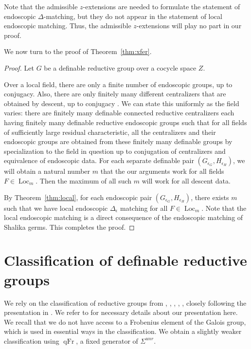 \documentclass[12pt]{amsart}
\newcommand{\op}[1]{\operatorname{#1}}
\theoremstyle{plain}
\theoremstyle{definition}
\begin{document}
Note that the admissible $z$-extensions are needed to formulate the
statement of endoscopic $\Delta$-matching, but they do not appear in
the statement of local endoscopic matching.  Thus, the admissible
$z$-extensions will play no part in our proof.

We now turn to the proof of Theorem~\ref{thm:xfer}.

\begin{proof} Let $G$ be a definable reductive group over a cocycle
  space $Z$.

  Over a local field, there are only a finite number of endoscopic
  groups, up to conjugacy.  Also, there are only finitely many
  different centralizers that are obtained by descent, up to conjugacy
  \cite[Sec.2.2]{LSd}.  We can state this uniformly as the field
  varies: there are finitely many definable connected reductive
  centralizers each having finitely many definable reductive
  endoscopic groups such that for all fields of sufficiently large
  residual characteristic, all the centralizers and their endoscopic
  groups are obtained from these finitely many definable groups by
  specialization to the field in question up to conjugation of
  centralizers and equivalence of endoscopic data.  For each separate
  definable pair $(G_{\epsilon_G},H_{\epsilon_H})$, we will obtain a
  natural number $m$ that the our arguments work for all fields $F\in
  \op{Loc}_m$.  Then the maximum of all such $m$ will work for all
  descent data.

  By Theorem~\ref{thm:local}, for each endoscopic pair
  $(G_{\epsilon_G},H_{\epsilon_H})$, there exists $m$ such that we
  have local endoscopic $\Delta_\epsilon$ matching for all
  $F\in\op{Loc}_m$.  Note that the local endoscopic matching is
  a direct consequence of the endoscopic matching of Shalika germs.  This
  completes the proof.
\end{proof}


\section{Classification of definable reductive groups}\label{sec:classification}

We rely on the classification of reductive groups from \cite{Gille},
\cite{Tits}, \cite{Sel}, \cite{Petrov}, \cite{reeder2010torsion},
closely following the presentation in \cite{Gross}.  We refer to
\cite{Gross} for necessary details about our presentation here.  We
recall that we do not have access to a Frobenius element of the Galois
group, which is used in essential ways in the classification.  We
obtain a slightly weaker classification using $\op{qFr}$, a fixed
generator of $\Sigma^{unr}$.
\end{document}

